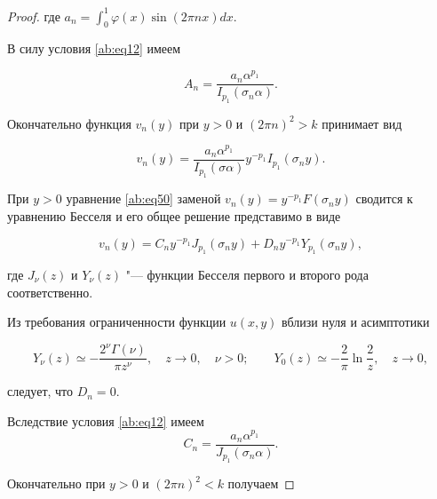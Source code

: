 \begin{proof}
где $a_n= \displaystyle \int _0^1\varphi(x)\sin(2\pi nx)dx$.







В силу условия \eqref{ab:eq12} имеем

$$A_n=\frac{a_n\alpha^{p_1}}{I_{p_1}(\sigma_n\alpha)}.$$



Окончательно функция $v_n(y)$ при $y>0$ и $(2\pi n)^2>k$ принимает вид

\begin{equation}\label{ab:eq13}

v_n(y)=\frac{a_n\alpha^{p_1}}{I_{p_1}(\sigma\alpha)}y^{-p_1}I_{p_1}(\sigma_ny).

\end{equation}



При $y>0$  уравнение \eqref{ab:eq50} заменой $v_n(y)=y^{-p_1}F(\sigma_n y)$ сводится к уравнению Бесселя \cite[c.~134]{ab:bib:Lebedev} и его общее решение представимо в виде

\begin{equation}\label{ab:eq52}

v_n(y)=C_ny^{-p_1}J_{p_1}(\sigma_n y)+D_ny^{-p_1}Y_{p_1}(\sigma_n y),

\end{equation}

где $J_{\nu}(z)$ и $Y_{\nu}(z)$ "--- функции Бесселя первого \cite[c.~132]{ab:bib:Lebedev} и второго \cite[c.~134]{ab:bib:Lebedev} рода соответственно.





Из требования ограниченности функции $u(x,y)$ вблизи нуля и асимптотики \cite[c.~172]{ab:bib:Lebedev}

\begin{equation}\label{ab:eq47} Y_{\nu}(z)\simeq-\frac{2^{\nu}\Gamma(\nu)}{\pi z^{\nu}},\quad z\to0,\quad \nu>0;\qquad Y_0(z)\simeq-\frac2\pi\ln\frac2z,\quad z\to0,

\end{equation}

 следует, что $D_n=0$. 

 

Вследствие условия \eqref{ab:eq12} имеем $$C_n=\frac{a_n\alpha^{p_1}}{J_{p_1}(\sigma_n\alpha)}.

$$



Окончательно при $y>0$ и $(2\pi n)^2<k$ получаем


\end{proof}
